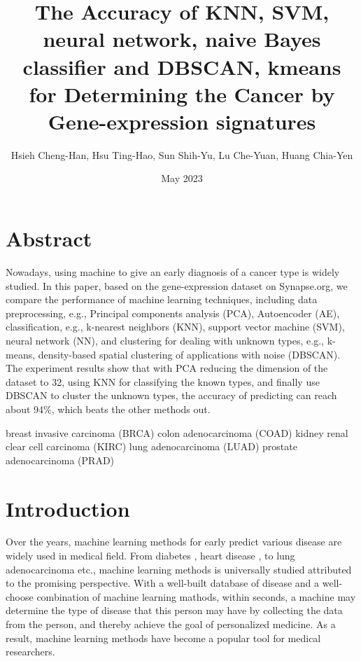 \documentclass[twocolumn,10pt]{article}
\begin{document}
\title{The Accuracy of KNN, SVM, neural network, naive Bayes classifier and DBSCAN, kmeans for Determining the Cancer by Gene-expression signatures}

\author{Hsieh Cheng-Han, Hsu Ting-Hao, Sun Shih-Yu, Lu Che-Yuan, Huang Chia-Yen}
\date{May 2023}
\maketitle

\section*{Abstract}
Nowadays, using machine to give an early diagnosis of a cancer type is widely studied. 
In this paper, based on the gene-expression dataset on Synapse.org, we compare the performance of machine 
learning techniques, including data preprocessing, 
e.g., Principal components analysis (PCA), Autoencoder (AE), classification, e.g., k-nearest neighbors (KNN), 
support vector machine (SVM), neural network (NN), and clustering for dealing with unknown types, 
e.g., k-means, density-based spatial clustering of applications with noise (DBSCAN). 
The experiment results show that with PCA reducing the dimension of the dataset to 32, using KNN for classifying
the known types, and finally use DBSCAN to cluster the unknown types, the accuracy of predicting can 
reach about 94\%, which beats the other methods out.

breast invasive carcinoma (BRCA)
colon adenocarcinoma (COAD)
kidney renal clear cell carcinoma (KIRC)
lung adenocarcinoma (LUAD)
prostate adenocarcinoma (PRAD)

\section{Introduction}
\label{sec:Introduction}
Over the years, machine learning methods for early predict various disease are widely used in medical field. 
\cite{kourou2015machine} \cite{cruz2006applications} From diabetes \cite{kavakiotis2017machine}, 
heart disease \cite{learning2017heart}, to lung adenocarcinoma \cite{huang2020machine} etc., machine learning 
methods is universally studied attributed to the promising perspective. With a well-built database of disease 
and a well-choose combination of machine learning mathods, within seconds, a machine may determine the type of disease that 
this person may have by collecting the data from the person, and thereby achieve the goal of personalized medicine. 
As a result, machine learning methods have become a popular tool for medical researchers. 
\end{document}
